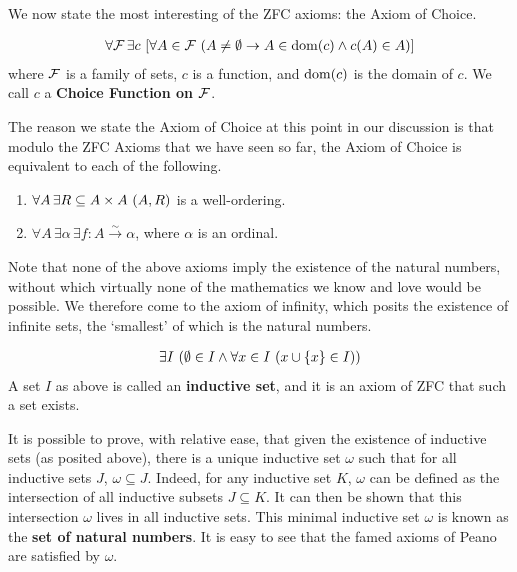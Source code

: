 We now state the most interesting of the ZFC axioms: the Axiom of Choice.

\begin{baxiom}\label{ZFC:AC}
    \hfill
    \begin{align*}
        \forall \mathcal{F} \, \exists c \, \left[ \forall A \in \mathcal{F} \, \left( A \neq \emptyset \to A \in \operatorname{dom}\!\left( c \right) \land c(A) \in A \right) \right]
    \end{align*}
    where $\mathcal{F}$ is a family of sets, $c$ is a function, and $\operatorname{dom}\!\left( c \right)$ is the domain of $c$. We call $c$ a \textbf{Choice Function on $\mathcal{F}$}.
\end{baxiom}

The reason we state the Axiom of Choice at this point in our discussion is that modulo the ZFC Axioms that we have seen so far, the Axiom of Choice is equivalent to each of the following.
\begin{enumerate}
    \item $\forall A \, \exists R \subseteq A \times A \, \left( A, R \right)$ is a well-ordering.
    \item $\forall A \, \exists \alpha \, \exists f : A \xrightarrow{\sim} \alpha$, where $\alpha$ is an ordinal.
\end{enumerate}

Note that none of the above axioms imply the existence of the natural numbers, without which virtually none of the mathematics we know and love would be possible. We therefore come to the axiom of infinity, which posits the existence of infinite sets, the `smallest' of which is the natural numbers.

\begin{baxiom}\label{ZFC:Infty}
    \hfill
    \begin{align*}
        \exists I \, \left( \emptyset \in I \land \forall x \in I \, \left( x \cup \left\{ x \right\} \in I \right) \right)
    \end{align*}
    A set $I$ as above is called an \textbf{inductive set}, and it is an axiom of ZFC that such a set exists.
\end{baxiom}

It is possible to prove, with relative ease, that given the existence of inductive sets (as posited above), there is a unique inductive set $\omega$ such that for all inductive sets $J$, $\omega \subseteq J$. Indeed, for any inductive set $K$, $\omega$ can be defined as the intersection of all inductive subsets $J \subseteq K$. It can then be shown that this intersection $\omega$ lives in all inductive sets. This minimal inductive set $\omega$ is known as the \textbf{set of natural numbers}. It is easy to see that the famed axioms of Peano are satisfied by $\omega$.

